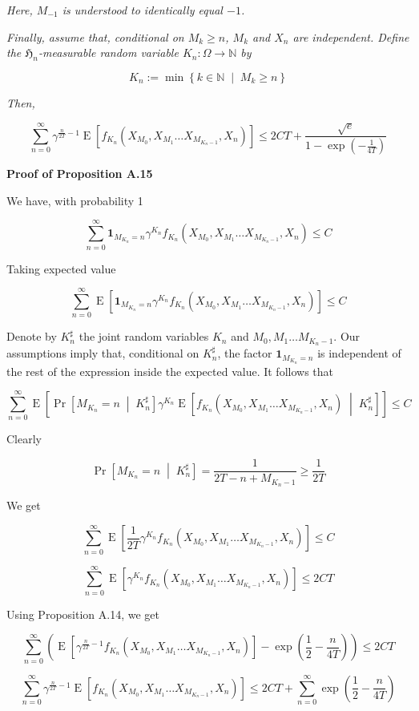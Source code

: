 \documentclass[a4paper]{article}
\newcommand{\Co}[1]{}
\newcommand{\AP}[1]{\left(#1\right)}
\newcommand{\AB}[1]{\left[#1\right]}
\newcommand{\ABM}[2]{\left[#1\;\middle\vert\;#2\right]}
\newcommand{\ACM}[2]{\left\{#1\;\middle\vert\;#2\right\}}
\newcommand{\CP}[3]{\underset{#1}{\operatorname{Pr}}\ABM{#2}{#3}}
\newcommand{\E}[1]{\operatorname{E}\AB{#1}}
\newcommand{\CE}[3]{\underset{#1}{\operatorname{E}}\ABM{#2}{#3}}
\newcommand{\Nats}{\mathbb{N}}
\newcommand{\KD}[1]{\boldsymbol{1}_{#1}}
\newcommand{\Fi}{\mathfrak{H}}
\begin{document}
\textit{Here, $M_{-1}$ is understood to identically equal $-1$.}\Co{i}

\textit{Finally, assume that, conditional on $M_k\geq n$, $M_k$ and $X_{n}$ are independent. Define the $\Fi_n$-measurable random variable $K_n:\Omega\rightarrow\Nats$ by}\Co{i}

$$K_n:=\min\ACM{k\in\Nats}{M_k\geq n}$$

\textit{Then,}\Co{i}

$$\sum_{n=0}^\infty\gamma^{\frac{n}{2T}-1}\E{f_{K_n}\AP{X_{M_0},X_{M_1}\ldots X_{M_{K_n-1}},X_n}}\leq 2CT+\frac{\sqrt{e}}{1-\exp\AP{-\frac{1}{4T}}}$$

\textbf{Proof of Proposition A.15}\Co{b}

We have, with probability 1

$$\sum_{n=0}^\infty\KD{M_{K_n}=n}\gamma^{K_n}f_{K_n}\AP{X_{M_0},X_{M_1}\ldots X_{M_{K_n-1}},X_n} \leq C$$

Taking expected value

$$\sum_{n=0}^\infty\E{\KD{M_{K_n}=n}\gamma^{K_n}f_{K_n}\AP{X_{M_0},X_{M_1}\ldots X_{M_{K_n-1}},X_n}} \leq C$$

Denote by $K_n^\sharp$ the joint random variables $K_n$ and $M_0,M_1\ldots M_{K_n-1}$. Our assumptions imply that, conditional on $K_n^\sharp$, the factor $\KD{M_{K_n}=n}$ is independent of the rest of the expression inside the expected value. It follows that

$$\sum_{n=0}^\infty\E{\CP{}{M_{K_n}=n}{K_n^\sharp}\gamma^{K_n}\CE{}{f_{K_n}\AP{X_{M_0},X_{M_1}\ldots X_{M_{K_n-1}},X_n}}{K_n^\sharp}} \leq C$$

Clearly

$$\CP{}{M_{K_n}=n}{K_n^\sharp}=\frac{1}{2T-n+M_{K_n-1}}\geq\frac{1}{2T}$$

We get

$$\sum_{n=0}^\infty\E{\frac{1}{2T}\gamma^{K_n}f_{K_n}\AP{X_{M_0},X_{M_1}\ldots X_{M_{K_n-1}},X_n}} \leq C$$

$$\sum_{n=0}^\infty\E{\gamma^{K_n}f_{K_n}\AP{X_{M_0},X_{M_1}\ldots X_{M_{K_n-1}},X_n}} \leq 2CT$$

Using Proposition A.14, we get

$$\sum_{n=0}^\infty\AP{\E{\gamma^{\frac{n}{2T}-1}f_{K_n}\AP{X_{M_0},X_{M_1}\ldots X_{M_{K_n-1}},X_n}}-\exp\AP{\frac{1}{2}-\frac{n}{4T}}} \leq 2CT$$

$$\sum_{n=0}^\infty\gamma^{\frac{n}{2T}-1}\E{f_{K_n}\AP{X_{M_0},X_{M_1}\ldots X_{M_{K_n-1}},X_n}} \leq 2CT+\sum_{n=0}^\infty\exp\AP{\frac{1}{2}-\frac{n}{4T}}$$
\end{document}
